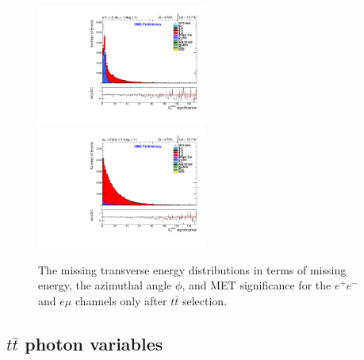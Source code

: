 \documentclass[oneside, a4paper, 11pt, ]{report}
\begin{document}
\begin{figure}
\includegraphics[width=0.5\textwidth]{Plots/ControlPlots/TTbarDiLeptonAnalysis/EE/MET/patType1CorrectedPFMet/METsignificance_splitTTbar_ratio.pdf}
\includegraphics[width=0.5\textwidth]{Plots/ControlPlots/TTbarDiLeptonAnalysis/EMu/MET/patType1CorrectedPFMet/METsignificance_splitTTbar_ratio.pdf}
\caption{The missing transverse energy distributions in terms of missing energy, the azimuthal angle $\phi$, and MET significance for the $e^{+}e^{-}$ and $e\mu$ channels only after $t\bar{t}$ selection.}
\label{fig-METplots}
\end{figure}

\subsection{$t\bar{t}$ photon variables}
\end{document}
